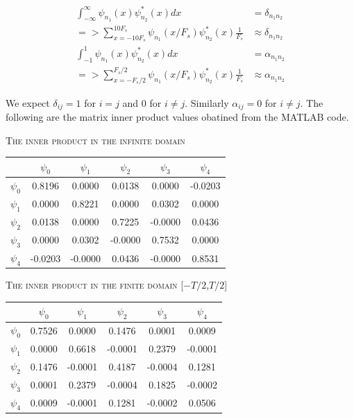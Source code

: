 \documentclass[a4paper,10pt]{article}
\begin{document}
\begin{align}
\int_{-\infty}^{\infty}\psi_{n_1}(x) \psi_{n_2}^*(x) dx &= \delta_{n_1n_2} \nonumber \\
=> \sum_{x=-10F_s}^{10F_s} \psi_{n_1}(x/F_s) \psi_{n_2}^*(x) \frac{1}{F_s} &\approx \delta_{n_1n_2} \nonumber \\
\int_{-1}^{1}\psi_{n_1}(x) \psi_{n_2}^*(x) dx &= \alpha_{n_1n_2} \nonumber \\
=> \sum_{x=-F_s/2}^{F_s/2} \psi_{n_1}(x/F_s) \psi_{n_2}^*(x) \frac{1}{F_s} &\approx \alpha_{n_1n_2} \nonumber
\end{align}

We expect $\delta_{ij}=1$ for $i=j$ and 0 for $i\neq j$. Similarly $\alpha_{ij} = 0$ for $i\neq j$. The following are the matrix inner product values obatined from the MATLAB code.

\begin{center}
\textsc{The inner product in the infinite domain}
\end{center}

\begin{center}
\begin{tabular}{|c|c|c|c|c|c|}
\hline
 & $\psi_0$ & $\psi_1$ & $\psi_2$ & $\psi_3$ & $\psi_4$ \\
\hline
$\psi_0$  & 0.8196  & 0.0000  & 0.0138  & 0.0000  & -0.0203 \\ \hline
$\psi_1$ & 0.0000  & 0.8221  & 0.0000  & 0.0302  & 0.0000  \\ \hline
$\psi_2$ & 0.0138  & 0.0000  & 0.7225  & -0.0000 & 0.0436  \\ \hline
$\psi_3$ & 0.0000  & 0.0302  & -0.0000 & 0.7532  & 0.0000  \\ \hline
$\psi_4$ & -0.0203 & -0.0000 & 0.0436  & -0.0000 & 0.8531  \\ \hline


\end{tabular}
\end{center}

\begin{center}
\textsc{The inner product in the finite domain [$-T/2$,$T/2$]}
\end{center}

\begin{center}
\begin{tabular}{|c|c|c|c|c|c|}
\hline
 & $\psi_0$ & $\psi_1$ & $\psi_2$ & $\psi_3$ & $\psi_4$ \\
  \hline
$\psi_0$ & 0.7526 & 0.0000  & 0.1476  & 0.0001  & 0.0009  \\ \hline
$\psi_1$ & 0.0000 & 0.6618  & -0.0001 & 0.2379  & -0.0001 \\ \hline
$\psi_2$ & 0.1476 & -0.0001 & 0.4187  & -0.0004 & 0.1281  \\ \hline
$\psi_3$ & 0.0001 & 0.2379  & -0.0004 & 0.1825  & -0.0002 \\ \hline
$\psi_4$ & 0.0009 & -0.0001 & 0.1281  & -0.0002 & 0.0506  \\ \hline

\end{tabular}
\end{center}
\end{document}
